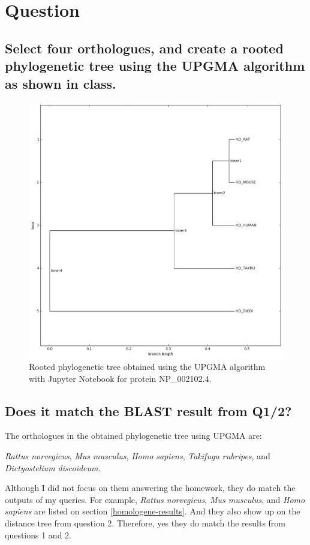\section{Question}

\subsection{Select four orthologues, and create a rooted phylogenetic tree using the UPGMA algorithm as shown in class.}

\begin{figure}[ht]
    \centering
    \includegraphics[width=0.8\linewidth]{res/rooted-phylogenetic-tree.png}
    \caption{Rooted phylogenetic tree obtained using the UPGMA algorithm with Jupyter Notebook for protein NP\_002102.4.}
    \label{fig:rooted-phylogenetic-tree}
\end{figure}


\subsection{Does it match the BLAST result from Q1/2?}

The orthologues in the obtained phylogenetic tree using UPGMA are:

\textit{Rattus norvegicus}, \textit{Mus musculus}, \textit{Homo sapiens}, \textit{Takifugu rubripes}, and \textit{Dictyostelium discoideum}.

Although I did not focus on them answering the homework, they do match the outputs of my queries. For example, \textit{Rattus norvegicus}, \textit{Mus musculus}, and \textit{Homo sapiens} are listed on section \ref{homologene-results}. And they also show up on the distance tree from question 2. Therefore, yes they do match the results from questions 1 and 2.

\newpage
